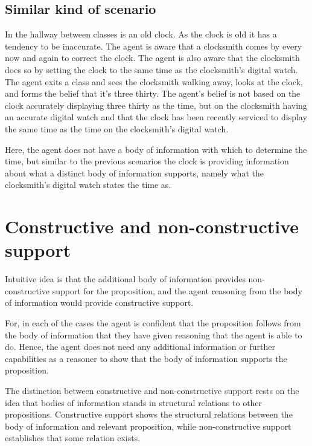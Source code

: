 \documentclass[10pt]{article}
\begin{document}
\subsection{Similar kind of scenario}
\label{sec:simil-kind-scen}

\begin{scenario}[Clocksmith]
  In the hallway between classes is an old clock.
  As the clock is old it has a tendency to be inaccurate.
  The agent is aware that a clocksmith comes by every now and again to correct the clock.
  The agent is also aware that the clocksmith does so by setting the clock to the same time as the clocksmith's digital watch.
  The agent exits a class and sees the clocksmith walking away, looks at the clock, and forms the belief that it's three thirty.
  The agent's belief is not based on the clock accurately displaying three thirty as the time, but on the clocksmith having an accurate digital watch and that the clock has been recently serviced to display the same time as the time on the clocksmith's digital watch.
\end{scenario}

Here, the agent does not have a body of information with which to determine the time, but similar to the previous scenarios the clock is providing information about what a distinct body of information supports, namely what the clocksmith's digital watch states the time as.

\section{Constructive and non-constructive support}
\label{sec:constr-non-constr}

Intuitive idea is that the additional body of information provides non-constructive support for the proposition, and the agent reasoning from the body of information would provide constructive support.

For, in each of the cases the agent is confident that the proposition follows from the body of information that they have given reasoning that the agent is able to do.
Hence, the agent does not need any additional information or further capabilities as a reasoner to show that the body of information supports the proposition.

The distinction between constructive and non-constructive support rests on the idea that bodies of information stands in structural relations to other propositions.
Constructive support shows the structural relations between the body of information and relevant proposition, while non-constructive support establishes that some relation exists.
\end{document}
